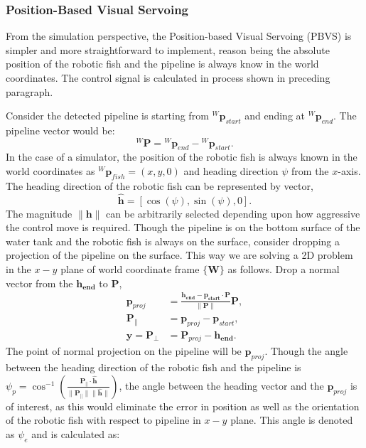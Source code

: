 \documentclass[pdflatex,sn-mathphys-num]{sn-jnl}
\theoremstyle{thmstyleone}%
\begin{document}
\subsubsection{Position-Based Visual Servoing}
\par From the simulation perspective, the Position-based Visual Servoing (PBVS) is simpler and more straightforward to implement, reason being the absolute position of the robotic fish and the pipeline is always know in the world coordinates. The control signal is calculated in process shown in preceding paragraph. 
\par Consider the detected pipeline is starting from ${}^W\mathbf{p}_{start}$ and ending at ${}^W\mathbf{p}_{end}$. The pipeline vector would be: 
\begin{equation*}
    {}^W\mathbf{P} = {}^W\mathbf{p}_{end} - {}^W\mathbf{p}_{start}.
\end{equation*}
In the case of a simulator, the position of the robotic fish is always known in the world coordinates as ${}^W\mathbf{p}_{fish} = (x,y,0)$ and heading direction $\psi$ from the $x$-axis. The heading direction of the robotic fish can be represented by vector,
\begin{equation*}
    \hat{\mathbf{h}} = [\cos(\psi), \sin(\psi), 0].
\end{equation*}
The magnitude $\|\mathbf{h}\|$ can be arbitrarily selected depending upon how aggressive the control move is required. Though the pipeline is on the bottom surface of the water tank and the robotic fish is always on the surface, consider dropping a projection of the pipeline on the surface. This way we are solving a 2D problem in the $x-y$ plane of world coordinate frame $\mathbf{\{W\}}$ as follows. Drop a normal vector from the $\mathbf{h_{end}}$ to $\mathbf{P}$, 
\begin{equation*}
    \begin{aligned}
        \mathbf{p}_{proj} &= \frac{\mathbf{h_{end} - p_{start}} \cdot \mathbf{P}}{\|\mathbf{P}\|} \mathbf{P}, \\
        \mathbf{P}_{\parallel} &= \mathbf{p}_{proj} - \mathbf{p}_{start}, \\
        \mathbf{y} = \mathbf{P_{\perp}} &=  \mathbf{P}_{proj} - \mathbf{h_{end}}.
    \end{aligned}
\end{equation*}
The point of normal projection on the pipeline will be $\mathbf{p}_{proj}$. Though the angle between the heading direction of the robotic fish and the pipeline is $\psi_p = \cos^{-1} \left( \frac{\mathbf{P}_{\parallel} \cdot \hat{\mathbf{h}}}{\|\mathbf{P}_{\parallel}\| \|\hat{\mathbf{h}}\|} \right)$, the angle between the heading vector and the $\mathbf{p}_{proj}$ is of interest, as this would eliminate the error in position as well as the orientation of the robotic fish with respect to pipeline in $x-y$ plane. This angle is denoted as $\psi_e$ and is calculated as:
\end{document}
